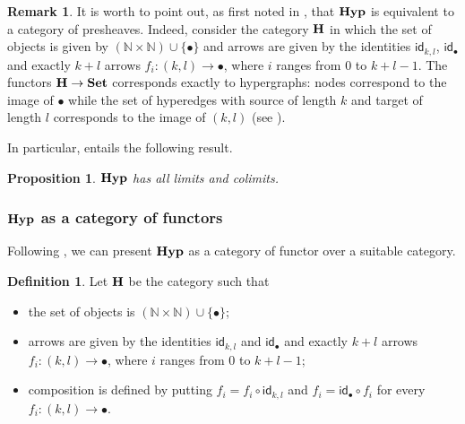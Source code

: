 \documentclass[a4paper,UKenglish,cleveref,pdftex,amsthm,thm-restate,numberwithinsect]{cas-sc}
\theoremstyle{plain}
\newtheorem{proposition}[theorem]{Proposition}
\theoremstyle{definition}
\newtheorem{definition}[theorem]{Definition}
\newtheorem{remark}[theorem]{Remark}
\newcommand{\Set}{\mathbf{Set}}
\newcommand{\catname}[1]{\textbf{\textup{#1}}}
\newcommand{\hyp}{\catname{Hyp}}
\newcommand{\id}[1]{\mathsf{id}_{#1}}
\begin{document}
\begin{remark}\label{rem:functor}
	It is worth to point out, as first noted in \cite{bonchi2022string}, that $\hyp$ is equivalent to a category of presheaves. 
	Indeed, consider the category $\catname{H}$ in which the set of objects is given by $ (\mathbb{N}\times \mathbb{N}) \cup \{\bullet\}$ and arrows are given by the identities $\id{k,l}$, $\id{\bullet}$ and exactly $k+l$ arrows $f_i\colon (k,l)\rightarrow \bullet$, where $i$ ranges from $0$ to $k+l-1$. 
	The functors $\catname{H}\to \Set$ corresponds exactly to hypergraphs: nodes correspond to the image of $\bullet$ while the set of hyperedges with source of length $k$ and target of length $l$ corresponds to the image of $(k,l)$ (see \cite{CastelnovoGM24}).
\end{remark}

In particular,  entails the following result. 

\begin{proposition}\label{prop:cocomp}
	$\hyp$ has all limits and colimits.
\end{proposition}

\iffalse
\subsubsection{$\hyp$ as a category of functors}

Following \cite{bonchi2022string}, we can present $\hyp$ as a category of functor over a suitable category.

\begin{definition}Let $\catname{H}$ be the category such that
	\begin{itemize}
		\item the set of objects is $ (\mathbb{N}\times \mathbb{N}) \cup \{\bullet\}$;
		\item arrows are given by the identities $\id{k,l}$ and $\id{\bullet}$ and exactly $k+l$ arrows $f_i\colon (k,l)\rightarrow \bullet$, where $i$ ranges from $0$ to $k+l-1$;
		\item composition is defined by putting
			$f_i=f_i\circ \id{k,l}$ and $f_i = \id{\bullet}\circ f_i$
		for every $f_i\colon (k,l)\rightarrow \bullet$.
	\end{itemize}
\end{definition}
\end{document}
